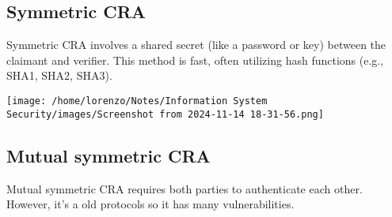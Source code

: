 \subsection{Symmetric CRA}
\begin{minipage}{0.3\textwidth}
    \vspace{-0.9cm}
    Symmetric CRA involves a shared secret (like a password or key) between 
    the claimant and verifier. This method is fast, often utilizing hash 
    functions (e.g., SHA1, SHA2, SHA3).
\end{minipage} 
\hspace{0.001cm}
\begin{minipage}{0.7\textwidth}
    \centering
    \texttt{[image: /home/lorenzo/Notes/Information System Security/images/Screenshot from 2024-11-14 18-31-56.png]}
\end{minipage}

\subsection{Mutual symmetric CRA}
Mutual symmetric CRA requires both parties to authenticate each other.
However, it's a old protocols so it has many vulnerabilities.